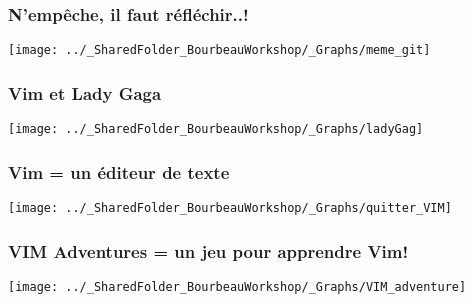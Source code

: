 \documentclass{beamer}
\begin{document}

	      \begin{frame}
	        \frametitle{N'empêche, il faut réfléchir..!} \vspace{1cm}   
	        \begin{center}
	           \texttt{[image: ../\_SharedFolder\_BourbeauWorkshop/\_Graphs/meme\_git]}
	        \end{center}  
	    \end{frame}
	    

	      \begin{frame}
	        \frametitle{Vim et Lady Gaga} \vspace{1cm}   
	        \begin{center}
	           \texttt{[image: ../\_SharedFolder\_BourbeauWorkshop/\_Graphs/ladyGag]}
	        \end{center}  
	    \end{frame}
	    

	      \begin{frame}
	        \frametitle{Vim = un éditeur de texte} \vspace{1cm}   
	        \begin{center}
	           \texttt{[image: ../\_SharedFolder\_BourbeauWorkshop/\_Graphs/quitter\_VIM]}
	        \end{center}  
	    \end{frame}
	    

	          \begin{frame}
	        \frametitle{VIM Adventures = un jeu pour apprendre Vim!} \vspace{1cm}   
	        \begin{center}
	           \texttt{[image: ../\_SharedFolder\_BourbeauWorkshop/\_Graphs/VIM\_adventure]}
	        \end{center}  
	    \end{frame}

\end{document}
